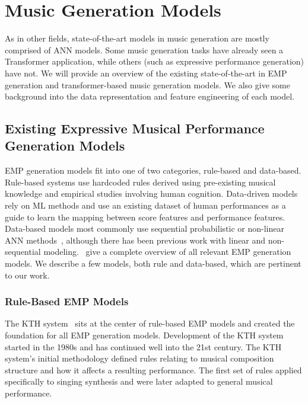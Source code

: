 \chapter{Music Generation Models}\label{ch:ch4}
As in other fields, state-of-the-art models in music generation are mostly comprised of ANN models. Some music generation tasks have already seen a Transformer application, while others (such as expressive performance generation) have not. We will provide an overview of the existing state-of-the-art in EMP generation and transformer-based music generation models. We also give some background into the data representation and feature engineering of each model. 

\section{Existing Expressive Musical Performance Generation Models}\label{sec:emp_generation_models}
EMP generation models fit into one of two categories, rule-based and data-based. Rule-based systems use hardcoded rules derived using pre-existing musical knowledge and empirical studies involving human cognition. Data-driven models rely on ML methods and use an existing dataset of human performances as a guide to learn the mapping between score features and performance features. Data-based models most commonly use sequential probabilistic or non-linear ANN methods~\cite{cancino2018computational}, although there has been previous work with linear and non-sequential modeling.~\citet{cancino2018computational} give a complete overview of all relevant EMP generation models. We describe a few models, both rule and data-based, which are pertinent to our work. 

\subsection{Rule-Based EMP Models}
The KTH system~\cite{friberg2006overview} sits at the center of rule-based EMP models and created the foundation for all EMP generation models. Development of the KTH system started in the 1980s and has continued well into the 21st century. The KTH system's initial methodology defined rules relating to musical composition structure and how it affects a resulting performance. The first set of rules applied specifically to singing synthesis and were later adapted to general musical performance. 

